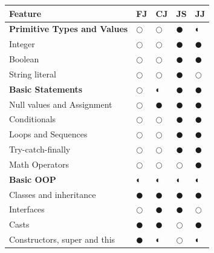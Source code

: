\documentclass[tese,capa,english]{texufpel}
\begin{document}
\begin{table}[!htb]
	\centering
	\begin{tabular}{lllll}
		\textbf{Feature}                                  & \textbf{FJ}   & \textbf{CJ}   & \textbf{JS}   & \textbf{JJ}   \\ \hline
		\textbf{Primitive Types and Values}                          & $\Circle$     & $\Circle$     & $\CIRCLE$     & $\LEFTcircle$ \\
		Integer                                           & $\Circle$     & $\Circle$     & $\CIRCLE$     & $\CIRCLE$     \\
		Boolean                                           & $\Circle$     & $\Circle$     & $\CIRCLE$     & $\CIRCLE$     \\
		String literal                                    & $\Circle$     & $\Circle$     & $\CIRCLE$     & $\Circle$     \\ \hline
		\textbf{Basic Statements}                         & $\Circle$     & $\LEFTcircle$ & $\CIRCLE$     & $\CIRCLE$     \\
		Null values and Assignment                                        & $\Circle$     & $\CIRCLE$     & $\CIRCLE$     & $\CIRCLE$     \\
		Conditionals                                      & $\Circle$     & $\Circle$     & $\CIRCLE$     & $\CIRCLE$     \\
		Loops and Sequences                                             & $\Circle$     & $\Circle$     & $\CIRCLE$     & $\CIRCLE$     \\
		Try-catch-finally                                 & $\Circle$     & $\Circle$     & $\CIRCLE$     & $\CIRCLE$     \\ 
		Math Operators                                             & $\Circle$     & $\Circle$     & $\Circle$     & $\CIRCLE$     \\ \hline
		\textbf{Basic OOP}                                & $\LEFTcircle$ & $\LEFTcircle$ & $\LEFTcircle$ & $\LEFTcircle$ \\
		Classes and inheritance                           & $\CIRCLE$     & $\CIRCLE$     & $\CIRCLE$     & $\CIRCLE$     \\
		Interfaces                                        & $\Circle$     & $\CIRCLE$     & $\CIRCLE$     & $\Circle$     \\
		Casts                                             & $\CIRCLE$     & $\CIRCLE$     & $\Circle$     & $\CIRCLE$     \\
		Constructors, super and this                      & $\CIRCLE$     & $\LEFTcircle$ & $\Circle$     & $\LEFTcircle$ \\

\end{tabular}
\end{table}
\end{document}
